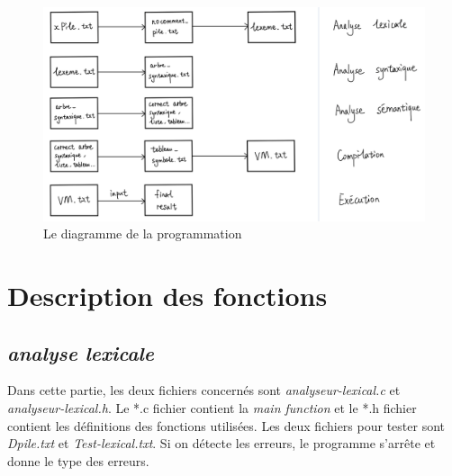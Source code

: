 \documentclass[a4paper,14pt,UTF8]{article}
\begin{document}
	\begin{figure}[h]
		\setlength{\abovecaptionskip}{-0.cm}
		
	\begin{center}
		\includegraphics[width=16cm]{system_diagram}
	\end{center}
		\caption{Le diagramme de la programmation}
	\end{figure}
	

	\section{Description des fonctions}
	
	\subsection{\textit{analyse lexicale}}
	\quad Dans cette partie, les deux fichiers concernés sont \textit{analyseur-lexical.c} et \textit{analyseur-lexical.h}. Le *.c fichier contient la \textit{main function} et le *.h fichier contient les définitions des fonctions utilisées. Les deux fichiers pour tester sont \textit{Dpile.txt} et \textit{Test-lexical.txt}. Si on détecte les erreurs, le programme s'arrête et donne le type des erreurs.  \par 
\end{document}
